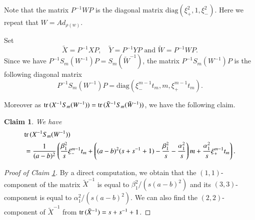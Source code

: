 \documentclass[a4paper]{amsart}
\theoremstyle{plain}
\newtheorem{claim}[theorem]{Claim}
\theoremstyle{definition}
\theoremstyle{remark}
\newtheorem{remark}{Remark}%
\newcommand{\trace}{{\rm tr}\,}
\begin{document}
Note that 
the matrix $P^{-1} W P$ is the diagonal matrix 
$\mathrm{diag}(\xi_{+}^2, 1, \xi_{-}^2)$. Here we repeat that $W = Ad_{\rho(w)}$.

Set 
$$\tilde X = P^{-1}XP,\quad  \tilde Y = P^{-1}YP \text{ and } \tilde W = P^{-1}WP.$$ 
Since we have $P^{-1}S_m(W^{-1}) P = S_m( \tilde W^{-1})$, 
the matrix $P^{-1} S_m (W^{-1}) P$ is the following diagonal matrix 
$$P^{-1} S_m (W^{-1}) P = \mathrm{diag}(\xi_{-}^{m-1} t_m, m, \xi_{+}^{m-1} t_m).$$

Moreover as $\trace(X^{-1}S_m(W^{-1})) = \trace(\tilde X^{-1} S_m(\tilde W^{-1}))$, we have the following claim.
%
\begin{claim}\label{trace_X^{-1}S_m}
We have
\begin{align*}
\lefteqn{
\trace(X^{-1}S_m(W^{-1})) }
& \\
&=
\frac{1}{(a-b)^2}
\left(
\frac{\beta_1^2}{s} \xi_{-}^{m-1} t_m 
+ \left((a-b)^2(s+s^{-1}+1)-\frac{\beta_1^2}{s} - \frac{\alpha_1^2}{s}\right)m
+\frac{\alpha_1^2}{s} \xi_{+}^{m-1} t_m
\right).
\end{align*}
\end{claim}
%
\begin{proof}[Proof of Claim \ref{trace_X^{-1}S_m}]
By a direct computation, we obtain that the $(1, 1)$-component of the matrix $\tilde X^{-1}$ is equal to $\beta_1^2 / (s(a-b)^2)$ and its 
$(3, 3)$-component is equal to $\alpha_1^2 / (s(a-b)^2)$. 
We can also find the $(2,2)$-component of $\tilde X^{-1}$ from $\trace(\tilde X^{-1}) = s+s^{-1}+1$.
\end{proof}
\end{document}
